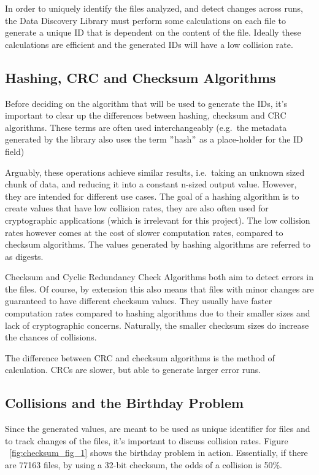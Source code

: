 In order to uniquely identify the files analyzed, and detect changes across runs, the Data Discovery Library must
perform some calculations on each file to generate a unique ID that is dependent on the content of the file.
Ideally these calculations are efficient and the generated IDs will have a low collision rate.

\subsection{Hashing, CRC and Checksum Algorithms}
Before deciding on the algorithm that will be used to generate the IDs, it's important to clear up the differences
between hashing, checksum and CRC algorithms.
These terms are often used interchangeably (e.g.\ the metadata generated by the library also uses the term \("\)hash\("\)
as a place-holder for the ID field)

Arguably, these operations achieve similar results, i.e.\ taking an unknown sized chunk of data, and reducing it into
a constant n-sized output value.
However, they are intended for different use cases.
The goal of a hashing algorithm is to create values that have low
collision rates, they are also often used for cryptographic applications (which is irrelevant for this project).
The low collision rates however comes at the cost of slower computation rates, compared to checksum algorithms.
The values generated by hashing algorithms are referred to as digests.

\newline

Checksum and Cyclic Redundancy Check Algorithms both aim to detect errors in the files.
Of course, by extension this
also means that files with minor changes are guaranteed to have different checksum values.
They usually have
faster computation rates compared to hashing algorithms due to their smaller sizes and lack of cryptographic concerns.
Naturally, the smaller checksum sizes do increase the chances of collisions.

The difference between CRC and checksum algorithms is the method of calculation.
CRCs are slower, but able to generate larger error runs.

\subsection{Collisions and the Birthday Problem}

Since the generated values, are meant to be used as unique identifier for files and to track changes of the files, it's important
to discuss collision rates. Figure ~\ref{fig:checksum_fig_1} shows the birthday problem in action.
Essentially, if there are 77163 files, by using a 32-bit checksum, the odds of a collision is 50\%.

